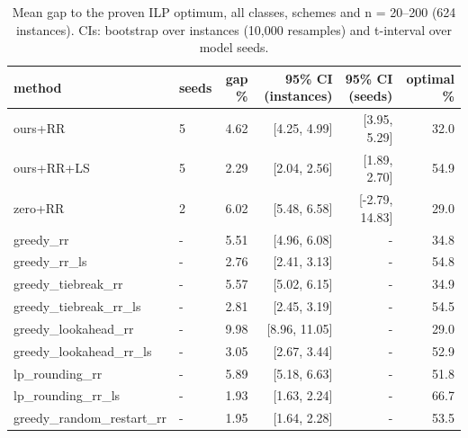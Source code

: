 \begin{table}[t]
\centering
\caption{Mean gap to the proven ILP optimum, all classes, schemes and n = 20--200 (624 instances). CIs: bootstrap over instances (10,000 resamples) and t-interval over model seeds.}
\label{tab:main_pooled}
\scriptsize
\begin{tabular}{llrrrr}
\toprule
method & seeds & gap \% & 95\% CI (instances) & 95\% CI (seeds) & optimal \% \\
\midrule
ours+RR & 5 & 4.62 & [4.25, 4.99] & [3.95, 5.29] & 32.0 \\
ours+RR+LS & 5 & 2.29 & [2.04, 2.56] & [1.89, 2.70] & 54.9 \\
zero+RR & 2 & 6.02 & [5.48, 6.58] & [-2.79, 14.83] & 29.0 \\
greedy\_rr & - & 5.51 & [4.96, 6.08] & - & 34.8 \\
greedy\_rr\_ls & - & 2.76 & [2.41, 3.13] & - & 54.8 \\
greedy\_tiebreak\_rr & - & 5.57 & [5.02, 6.15] & - & 34.9 \\
greedy\_tiebreak\_rr\_ls & - & 2.81 & [2.45, 3.19] & - & 54.5 \\
greedy\_lookahead\_rr & - & 9.98 & [8.96, 11.05] & - & 29.0 \\
greedy\_lookahead\_rr\_ls & - & 3.05 & [2.67, 3.44] & - & 52.9 \\
lp\_rounding\_rr & - & 5.89 & [5.18, 6.63] & - & 51.8 \\
lp\_rounding\_rr\_ls & - & 1.93 & [1.63, 2.24] & - & 66.7 \\
greedy\_random\_restart\_rr & - & 1.95 & [1.64, 2.28] & - & 53.5 \\
\bottomrule
\end{tabular}
\end{table}
